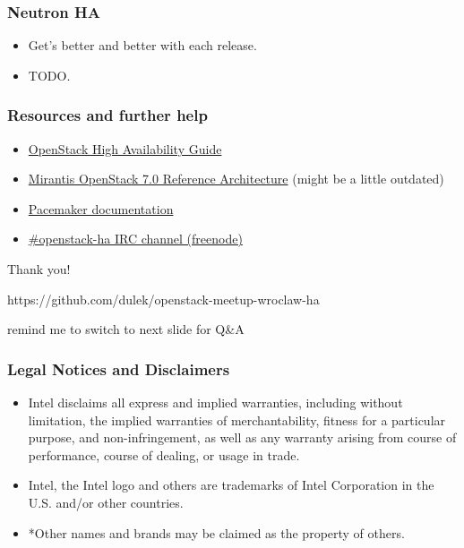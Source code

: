 \documentclass[aspectratio=43]{beamer}
\begin{document}
\begin{frame}
    \frametitle{Neutron HA}
    \begin{itemize}
        \item Get's better and better with each release.
        \item TODO.
    \end{itemize}
\end{frame}

\begin{frame}
    \frametitle{Resources and further help}
    \begin{itemize}
        \item \href{http://docs.openstack.org/ha-guide/}{OpenStack High Availability Guide}
        \item \href{https://docs.mirantis.com/openstack/fuel/fuel-7.0/reference-architecture.html}{Mirantis OpenStack 7.0 Reference Architecture} (might be a little outdated)
        \item \href{http://clusterlabs.org/}{Pacemaker documentation}
        \item \href{irc://chat.freenode.net/openstack-ha}{\#openstack-ha IRC channel (freenode)}
    \end{itemize}
\end{frame}

\begin{frame}
    \begin{center}
        \huge Thank you!

        \vfill

        \Large https://github.com/dulek/openstack-meetup-wroclaw-ha

        \vfill

        \small remind me to switch to next slide for Q\&A
    \end{center}
\end{frame}

\begin{frame}
    \frametitle{Legal Notices and Disclaimers}
    \begin{itemize}
\item Intel disclaims all express and implied warranties, including without
limitation, the implied warranties of merchantability, fitness for a particular
purpose, and non-infringement, as well as any warranty arising from course of
performance, course of dealing, or usage in trade.

\item Intel, the Intel logo and others are trademarks of Intel Corporation in the 
U.S. and/or other countries.

\item *Other names and brands may be claimed as the property of others.
    \end{itemize}
\end{frame}
\end{document}
